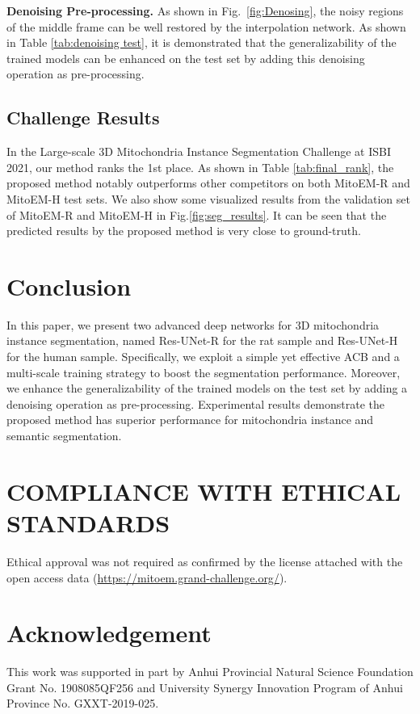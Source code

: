 \documentclass{article}
\begin{document}
\textbf{Denoising Pre-processing.} As shown in Fig.~\ref{fig:Denosing}, the noisy regions of the middle frame can be well restored by the interpolation network.
As shown in Table \ref{tab:denoising test}, it is demonstrated that the generalizability of the trained models can be enhanced on the test set by adding this denoising operation as pre-processing.

\vspace{-0.3cm}
\subsection{Challenge Results}
\vspace{-0.2cm}
In the Large-scale 3D Mitochondria Instance Segmentation Challenge at ISBI 2021, our method ranks the 1st place. As shown in Table \ref{tab:final_rank}, the proposed method notably outperforms other competitors on both MitoEM-R and MitoEM-H test sets.  We also show some visualized results from the validation set of MitoEM-R and MitoEM-H in Fig.\ref{fig:seg_results}. It can be seen that the predicted results by the proposed method is very close to ground-truth.

\vspace{-0.3cm}

\section{Conclusion}
\label{sec:conclusion}
In this paper, we present two advanced deep networks for 3D mitochondria instance segmentation, named Res-UNet-R for the rat sample and Res-UNet-H for the human sample.  Specifically, we exploit a simple yet effective ACB and  a multi-scale training strategy to boost the segmentation performance.  Moreover, we enhance the generalizability of the trained models on the test set by adding a denoising operation as pre-processing. 
Experimental results demonstrate the proposed method has superior performance for mitochondria instance and semantic segmentation.




\section{COMPLIANCE WITH ETHICAL STANDARDS}
Ethical approval was not required as confirmed by the license attached with the open access data (\url{https://mitoem.grand-challenge.org/}).

\section{Acknowledgement}
This work was supported in part by Anhui Provincial Natural Science Foundation Grant No. 1908085QF256 and University Synergy Innovation Program of Anhui Province No. GXXT-2019-025.




\end{document}
